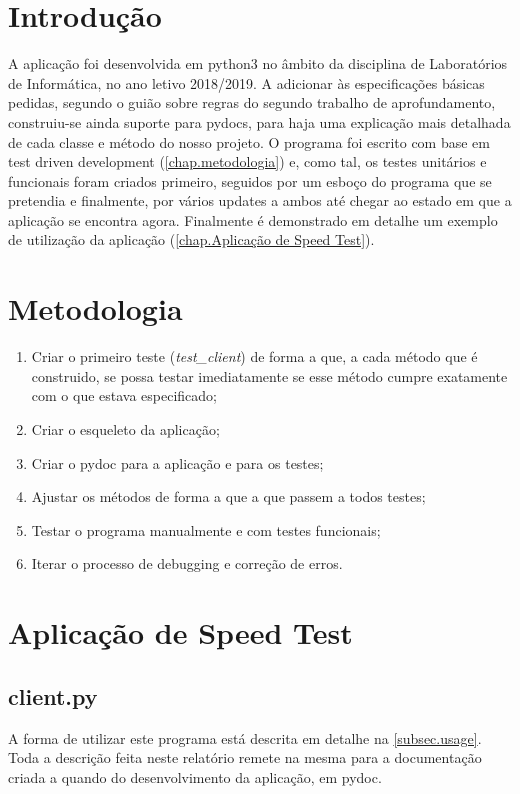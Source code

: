 \documentclass{report}
\begin{document}
\chapter{Introdução}
\label{chap.introducao}

A aplicação foi desenvolvida em python3 no âmbito da disciplina de Laboratórios de Informática, no ano letivo 2018/2019. A adicionar às especificações básicas pedidas, segundo o guião sobre regras do segundo trabalho de aprofundamento, construiu-se ainda suporte para pydocs, para haja uma explicação mais detalhada de cada classe e método do nosso projeto. O programa foi escrito com base em test driven development  (\autoref{chap.metodologia}) e, como tal, os testes unitários e funcionais foram criados primeiro, seguidos por um esboço do programa que se pretendia e finalmente, por vários updates a ambos até chegar ao estado em que a aplicação se encontra agora. Finalmente é demonstrado em detalhe um exemplo de utilização da aplicação (\autoref{chap.Aplicação de Speed Test}).


\chapter{Metodologia}
\label{chap.metodologia}

\begin{enumerate}
	\item Criar o primeiro teste (\textit{test\_client}) de forma a que, a cada método que é construido, se possa testar imediatamente se esse método cumpre exatamente com o que estava especificado;
	\item Criar o esqueleto da aplicação;
	\item Criar o pydoc para a aplicação e para os testes;
	\item Ajustar os métodos de forma a que a que passem a todos testes;
	\item Testar o programa manualmente e com testes funcionais;
	\item Iterar o processo de debugging e correção de erros.
\end{enumerate}


\chapter{Aplicação de Speed Test}
\label{chap.Aplicação de Speed Test}
\section{client.py}
\label{sec.client}
A forma de utilizar este programa está descrita em detalhe na \autoref{subsec.usage}. Toda a descrição feita neste relatório remete na mesma para a documentação criada a quando do desenvolvimento da aplicação, em pydoc.
\end{document}
